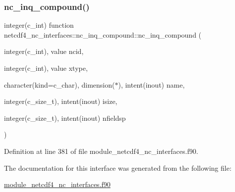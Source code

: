 \subsubsection{\texorpdfstring{nc\+\_\+inq\+\_\+compound()}{nc\_inq\_compound()}}
{\footnotesize\ttfamily integer(c\+\_\+int) function netcdf4\+\_\+nc\+\_\+interfaces\+::nc\+\_\+inq\+\_\+compound\+::nc\+\_\+inq\+\_\+compound (\begin{DoxyParamCaption}\item[{integer(c\+\_\+int), value}]{ncid,  }\item[{integer(c\+\_\+int), value}]{xtype,  }\item[{character(kind=c\+\_\+char), dimension($\ast$), intent(inout)}]{name,  }\item[{integer(c\+\_\+size\+\_\+t), intent(inout)}]{isize,  }\item[{integer(c\+\_\+size\+\_\+t), intent(inout)}]{nfieldsp }\end{DoxyParamCaption})}



Definition at line 381 of file module\+\_\+netcdf4\+\_\+nc\+\_\+interfaces.\+f90.



The documentation for this interface was generated from the following file\+:\begin{DoxyCompactItemize}
\item 
\hyperlink{module__netcdf4__nc__interfaces_8f90}{module\+\_\+netcdf4\+\_\+nc\+\_\+interfaces.\+f90}\end{DoxyCompactItemize}
